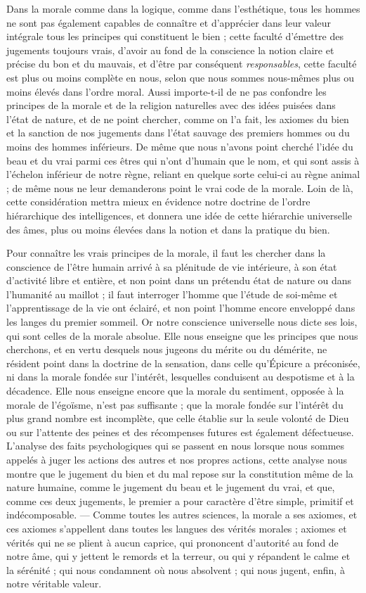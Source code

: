 \documentclass[a4paper, 11pt, oneside, landscape]{article}
\begin{document}
Dans la morale comme dans la logique, comme dans l'esthétique, tous les hommes ne sont pas également capables de connaître et d'apprécier dans leur valeur intégrale tous les principes qui constituent le bien ; cette faculté d'émettre des jugements toujours vrais, d'avoir au fond de la conscience la notion claire et précise du bon et du mauvais, et d'être par conséquent \emph{responsables}, cette faculté est plus ou moins complète en nous, selon que nous sommes nous-mêmes plus ou moins élevés dans l'ordre moral. Aussi importe-t-il de ne pas confondre les principes de la morale et de la religion naturelles avec des idées puisées dans l'état de nature, et de ne point chercher, comme on l'a fait, les axiomes du bien et la sanction de nos jugements dans l'état sauvage des premiers hommes ou du moins des hommes inférieurs. De même que nous n'avons point cherché l'idée du beau et du vrai parmi ces êtres qui n'ont d'humain que le nom, et qui sont assis à l'échelon inférieur de notre règne, reliant en quelque sorte celui-ci au règne animal ; de même nous ne leur demanderons point le vrai code de la morale. Loin de là, cette considération mettra mieux en évidence notre doctrine de l'ordre hiérarchique des intelligences, et donnera une idée de cette hiérarchie universelle des âmes, plus ou moins élevées dans la notion et dans la pratique du bien.

Pour connaître les vrais principes de la morale, il faut les chercher dans la conscience de l'être humain arrivé à sa plénitude de vie intérieure, à son état d'activité libre et entière, et non point dans un prétendu état de nature ou dans l'humanité au maillot ; il faut interroger l'homme que l'étude de soi-même et l'apprentissage de la vie ont éclairé, et non point l'homme encore enveloppé dans les langes du premier sommeil. Or notre conscience universelle nous dicte ses lois, qui sont celles de la morale absolue. Elle nous enseigne que les principes que nous cherchons, et en vertu desquels nous jugeons du mérite ou du démérite, ne résident point dans la doctrine de la sensation, dans celle qu'Épicure a préconisée, ni dans la morale fondée sur l'intérêt, lesquelles conduisent au despotisme et à la décadence. Elle nous enseigne encore que la morale du sentiment, opposée à la morale de l'égoïsme, n'est pas suffisante ; que la morale fondée sur l'intérêt du plus grand nombre est incomplète, que celle établie sur la seule volonté de Dieu ou sur l'attente des peines et des récompenses futures est également défectueuse. L'analyse des faits psychologiques qui se passent en nous lorsque nous sommes appelés à juger les actions des autres et nos propres actions, cette analyse nous montre que le jugement du bien et du mal repose sur la constitution même de la nature humaine, comme le jugement du beau et le jugement du vrai, et que, comme ces deux jugements, le premier a pour caractère d'être simple, primitif et indécomposable. --- Comme toutes les autres sciences, la morale a ses axiomes, et ces axiomes s'appellent dans toutes les langues des vérités morales ; axiomes et vérités qui ne se plient à aucun caprice, qui prononcent d'autorité au fond de notre âme, qui y jettent le remords et la terreur, ou qui y répandent le calme et la sérénité ; qui nous condamnent où nous absolvent ; qui nous jugent, enfin, à notre véritable valeur.
\end{document}
